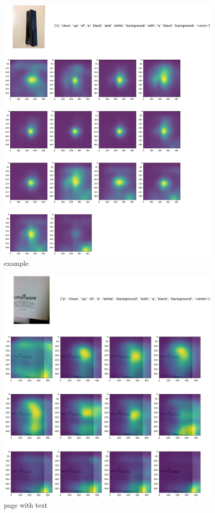\documentclass[11pt,a4paper]{article}
\begin{document}
\begin{figure}[h]
  \includegraphics[width=\linewidth]{VizWiz_train_00013366.png}
  \caption{example}
  \label{fig:stapler}
\end{figure}

\begin{figure}[h]
  \includegraphics[width=\linewidth]{VizWiz_train_00023423.png}
  \caption{page with text}
  \label{fig:whitetext}
\end{figure}
\end{document}

